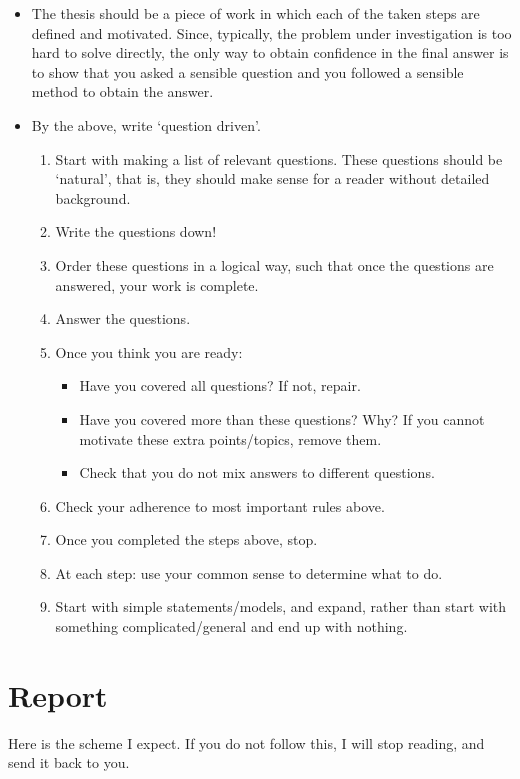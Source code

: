 \documentclass{article}
\begin{document}
\begin{itemize}
\item The thesis should be a piece of work in which each of the taken
  steps are defined and motivated. Since, typically, the problem under
  investigation is too hard to solve directly, the only way to obtain
  confidence in the final answer is to show that you asked a sensible
  question and you followed a sensible method to obtain the answer. 
\item By the above, write `question driven'.  
\begin{enumerate}
\item Start with making a list of relevant questions.  These questions
  should be `natural', that is, they should make sense for a reader
  without detailed background.
\item Write the questions down!
\item Order these questions in a logical way, such that once the
  questions are answered, your work is complete.
\item Answer the questions.
\item Once you think you are ready: 
  \begin{itemize}
  \item Have you covered all questions? If not, repair.
  \item Have you covered more than these questions? Why? If you cannot
    motivate these extra points/topics, remove them. 
  \item Check that you do not mix answers to different questions.
  \end{itemize}
\item Check your adherence to most important rules above.
\item Once you completed the steps  above, stop. 
\item At each step: use your common sense to determine what to
  do. 
\item Start with simple statements/models, and expand, rather than
  start with something complicated/general and end up with nothing.
\end{enumerate}
\end{itemize}



\section{Report}
\label{sec:report}

Here is the  scheme I expect. If you do not follow this,  I will stop reading, and send it back to you.
\end{document}
